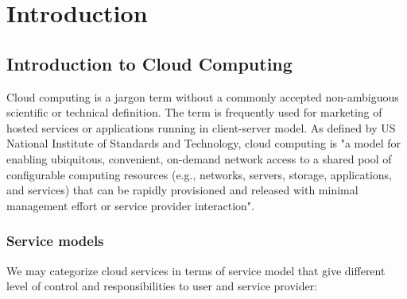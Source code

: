 \chapter{Introduction}
\label{chap:introduction} 




\section{Introduction to Cloud Computing}

Cloud computing is a jargon term without a commonly accepted non-ambiguous scientific or technical definition. The term is frequently used for marketing of hosted services or applications running in client-server model. As defined by US National Institute of Standards and Technology\cite{NISTCloudDef}, cloud computing is "a model for enabling ubiquitous, convenient, on-demand network access to a shared pool of configurable computing resources (e.g., networks, servers, storage, applications, and services) that can be rapidly provisioned and released with minimal management effort or service provider interaction".

\subsection{Service models}

We may categorize cloud services in terms of service model that give different level of control and responsibilities to user and service provider:

